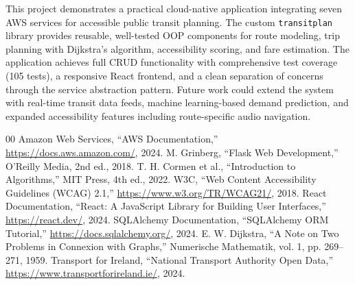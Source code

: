 \documentclass[conference]{IEEEtran}
\begin{document}
This project demonstrates a practical cloud-native application integrating seven AWS services for accessible public transit planning. The custom \texttt{transitplan} library provides reusable, well-tested OOP components for route modeling, trip planning with Dijkstra's algorithm, accessibility scoring, and fare estimation. The application achieves full CRUD functionality with comprehensive test coverage (105 tests), a responsive React frontend, and a clean separation of concerns through the service abstraction pattern. Future work could extend the system with real-time transit data feeds, machine learning-based demand prediction, and expanded accessibility features including route-specific audio navigation.

\begin{thebibliography}{00}
 Amazon Web Services, ``AWS Documentation,'' \url{https://docs.aws.amazon.com/}, 2024.
 M. Grinberg, ``Flask Web Development,'' O'Reilly Media, 2nd ed., 2018.
 T. H. Cormen et al., ``Introduction to Algorithms,'' MIT Press, 4th ed., 2022.
 W3C, ``Web Content Accessibility Guidelines (WCAG) 2.1,'' \url{https://www.w3.org/TR/WCAG21/}, 2018.
 React Documentation, ``React: A JavaScript Library for Building User Interfaces,'' \url{https://react.dev/}, 2024.
 SQLAlchemy Documentation, ``SQLAlchemy ORM Tutorial,'' \url{https://docs.sqlalchemy.org/}, 2024.
 E. W. Dijkstra, ``A Note on Two Problems in Connexion with Graphs,'' Numerische Mathematik, vol. 1, pp. 269--271, 1959.
 Transport for Ireland, ``National Transport Authority Open Data,'' \url{https://www.transportforireland.ie/}, 2024.
\end{thebibliography}
\end{document}
